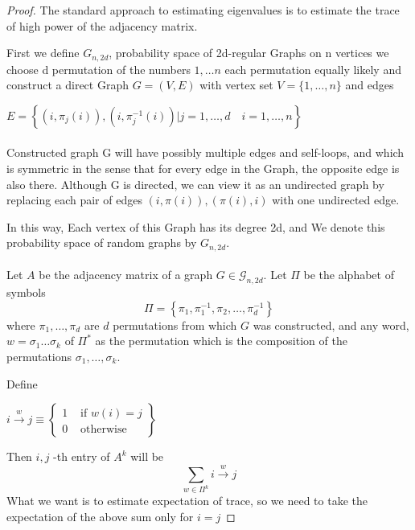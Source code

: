 \documentclass[oneside]{book}
\begin{document}
\begin{proof}

 The standard approach to estimating eigenvalues is to estimate the trace of high power of the adjacency matrix.\par
First we define ${G}_{n, 2d}$, probability space of 2d-regular Graphs on n vertices    we choose d permutation of the numbers ${1,\ldots n}$ each permutation equally likely and construct a direct Graph $G = (V,E) $ with  vertex set $V=\{1, \ldots, n\}$ and edges\par
$E=\left\{\left(i, \pi_{j}(i)\right),\left(i, \pi_{j}^{-1}(i)\right) | j=1, \ldots, d \quad i=1, \ldots, n\right\}$ \\\\
Constructed graph G will have possibly multiple edges and self-loops, and which is symmetric in the sense that for every edge in the Graph, the opposite edge is also there. Although G is directed, we can view it as an undirected graph by
replacing each pair of edges $(i, \pi(i)), (\pi(i), i) $ with one undirected edge.\par In this way, Each vertex of this Graph has its degree 2d, and  We denote
this probability space of random graphs by $G_{n,2d}$. \\\\

Let $A$ be the adjacency matrix of a graph $G \in \mathscr{G}_{n, 2 d}$. Let $\Pi$ be the alphabet of symbols
$$
\Pi=\left\{\pi_{1}, \pi_{1}^{-1}, \pi_{2}, \ldots, \pi_{d}^{-1}\right\}
$$
where  $\pi_{1}, \ldots, \pi_{d}$ are  $d$ permutations from which $G$ was constructed, and any word, $w=\sigma_{1} \ldots \sigma_{k}$ of $\Pi^{*}$ as the permutation which is the composition of the permutations $\sigma_{1}, \ldots, \sigma_{k} .$ \par
Define  \begin{center}
   $i \stackrel{w}{\rightarrow} j \equiv\left\{\begin{array}{ll}
1 & \text { if  }  w(i)=j \\
0 & \text { otherwise }
\end{array}\right\}$ 
\end{center}
Then  $i, j$ -th entry of $A^{k}$ will be 
$$
\sum_{w \in \Pi^{k}} i \stackrel{w}{\rightarrow} j
$$
What we want is  to estimate expectation of  trace, so we need to take the expectation of the above sum only for  $i = j$      


\end{proof}
\end{document}
